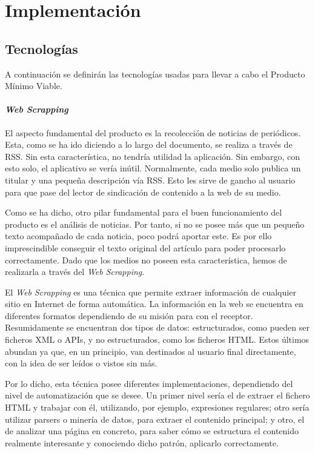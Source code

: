 
\chapter{Implementación}\label{implementacion}
\section{Tecnologías}\label{sec:tecnologias}

A continuación se definirán las tecnologías usadas para llevar a cabo el Producto Mínimo Viable.

\subsubsection{\textit{Web Scrapping}}
El aspecto fundamental del producto es la recolección de noticias de periódicos. Esta, como se ha ido diciendo a lo largo del documento, se realiza a través de RSS. Sin esta característica, no tendría utilidad la aplicación. Sin embargo, con esto solo, el aplicativo se vería inútil. Normalmente, cada medio solo publica un titular y una pequeña descripción vía RSS. Esto les sirve de gancho al usuario para que pase del lector de sindicación de contenido a la web de su medio.

Como se ha dicho, otro pilar fundamental para el buen funcionamiento del producto es el análisis de noticias. Por tanto, si no se posee más que un pequeño texto acompañado de cada noticia, poco podrá aportar este. Es por ello imprescindible conseguir el texto original del artículo para poder procesarlo correctamente. Dado que los medios no poseen esta característica, hemos de realizarla a través del \textit{Web Scrapping}.

El \textit{Web Scrapping} es una técnica que permite extraer información de cualquier sitio en Internet de forma automática. La información en la web se encuentra en diferentes formatos dependiendo de su misión para con el receptor. Resumidamente se encuentran dos tipos de datos: estructurados, como pueden ser ficheros XML o APIs, y no estructurados, como los ficheros HTML. Estos últimos abundan ya que, en un principio, van destinados al usuario final directamente, con la idea de ser leídos o vistos sin más.


Por lo dicho, esta técnica posee diferentes implementaciones, dependiendo del nivel de automatización que se desee. Un primer nivel sería el de extraer el fichero HTML y trabajar con él, utilizando, por ejemplo, expresiones regulares; otro sería utilizar parsers o minería de datos, para extraer el contenido principal; y otro, el de analizar una página en concreto, para saber cómo se estructura el contenido realmente interesante y conociendo dicho patrón, aplicarlo correctamente.

